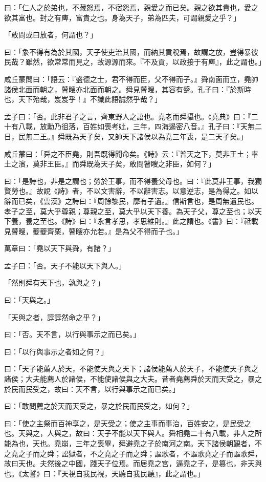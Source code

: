 \documentclass[12pt,a4paper]{ctexbook}
\begin{document}
曰：「仁人之於弟也，不藏怒焉，不宿怨焉，親愛之而已矣。親之欲其貴也，愛之欲其富也。封之有庳，富貴之也。身為天子，弟為匹夫，可謂親愛之乎？」\par
「敢問或曰放者，何謂也？」\par
曰：「象不得有為於其國，天子使吏治其國，而納其貢稅焉，故謂之放，豈得暴彼民哉？雖然，欲常常而見之，故源源而來。『不及貢，以政接于有庳』，此之謂也。」\par
咸丘蒙問曰：「語云：『盛德之士，君不得而臣，父不得而子。』舜南面而立，堯帥諸侯北面而朝之，瞽瞍亦北面而朝之。舜見瞽瞍，其容有蹙。孔子曰：『於斯時也，天下殆哉，岌岌乎！』不識此語誠然乎哉？」\par
孟子曰：「否。此非君子之言，齊東野人之語也。堯老而舜攝也。《堯典》曰：『二十有八載，放勳乃徂落，百姓如喪考妣，三年，四海遏密八音。』孔子曰：『天無二日，民無二王。』舜既為天子矣，又帥天下諸侯以為堯三年喪，是二天子矣。」\par
咸丘蒙曰：「舜之不臣堯，則吾既得聞命矣。《詩》云：『普天之下，莫非王土；率土之濱，莫非王臣。』而舜既為天子矣，敢問瞽瞍之非臣，如何？」\par
曰：「是詩也，非是之謂也；勞於王事，而不得養父母也。曰：『此莫非王事，我獨賢勞也。』故說《詩》者，不以文害辭，不以辭害志。以意逆志，是為得之。如以辭而已矣，《雲漢》之詩曰：『周餘黎民，靡有孑遺。』信斯言也，是周無遺民也。孝子之至，莫大乎尊親；尊親之至，莫大乎以天下養。為天子父，尊之至也；以天下養，養之至也。《詩》曰：『永言孝思，孝思維則。』此之謂也。《書》曰：『祗載見瞽瞍，夔夔齊栗，瞽瞍亦允若。』是為父不得而子也。」\par
萬章曰：「堯以天下與舜，有諸？」\par
孟子曰：「否。天子不能以天下與人。」\par
「然則舜有天下也，孰與之？」\par
曰：「天與之。」\par
「天與之者，諄諄然命之乎？」\par
曰：「否。天不言，以行與事示之而已矣。」\par
曰：「以行與事示之者如之何？」\par
曰：「天子能薦人於天，不能使天與之天下；諸侯能薦人於天子，不能使天子與之諸侯；大夫能薦人於諸侯，不能使諸侯與之大夫。昔者堯薦舜於天而天受之，暴之於民而民受之，故曰：天不言，以行與事示之而已矣。」\par
曰：「敢問薦之於天而天受之，暴之於民而民受之，如何？」\par
曰：「使之主祭而百神享之，是天受之；使之主事而事治，百姓安之，是民受之也。天與之，人與之，故曰：天子不能以天下與人。舜相堯二十有八載，非人之所能為也，天也。堯崩，三年之喪畢，舜避堯之子於南河之南。天下諸侯朝覲者，不之堯之子而之舜；訟獄者，不之堯之子而之舜；謳歌者，不謳歌堯之子而謳歌舜，故曰天也。夫然後之中國，踐天子位焉。而居堯之宮，逼堯之子，是篡也，非天與也。《太誓》曰：『天視自我民視，天聽自我民聽』，此之謂也。」\par
\end{document}
